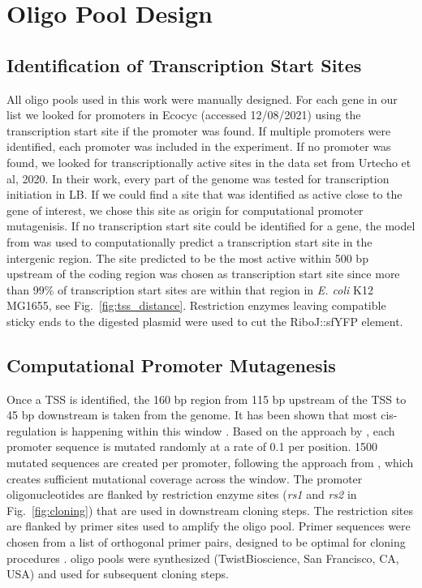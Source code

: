 \section{Oligo Pool Design} \label{sec:oligo_pool}
\subsection{Identification of Transcription Start Sites}
\label{sec:ident_tss}
All oligo pools used in this work were manually designed. For each gene in our list we looked for promoters in Ecocyc \cite{keseler2010ecocyc} (accessed 12/08/2021) using the transcription start site if the promoter was found. If multiple promoters were identified, each promoter was included in the experiment. If no promoter was found, we looked for transcriptionally active sites in the data set from Urtecho et al, 2020\cite{urtecho2020genome}. In their work, every part of the genome was tested for transcription initiation in LB. If we could find a site that was identified as active close to the gene of interest, we chose this site as origin for computational promoter mutagenisis. If no transcription start site could be identified for a gene, the model from \cite{la2021automated} was used to computationally predict a transcription start site in the intergenic region. The site predicted to be the most active within 500 bp upstream of the coding region was chosen as transcription start site since more than 99\% of transcription start sites are within that region in \textit{E. coli} K12 MG1655, see Fig.~\ref{fig:tss_distance}. Restriction enzymes leaving compatible sticky ends to the digested plasmid were used to cut the RiboJ::sfYFP element.  


\subsection{Computational Promoter Mutagenesis}
\label{sec:comp_prom_muta}
Once a TSS is identified, the 160 bp region from 115 bp upstream of the TSS to 45 bp downstream is taken from the genome. It has been shown that most cis-regulation is happening within this window \cite{rydenfelt2014statistical}. Based on the approach by \cite{kinney2010using}, each promoter sequence is mutated randomly at a rate of 0.1 per position. 1500 mutated sequences are created per promoter, following the approach from \cite{ireland2020deciphering}, which creates sufficient mutational coverage across the window. The promoter oligonucleotides are flanked by restriction enzyme sites (\textit{rs1} and \textit{rs2} in Fig.~\ref{fig:cloning}) that are used in downstream cloning steps. The restriction sites are flanked by primer sites used to amplify the oligo pool. Primer sequences were chosen from a list of orthogonal primer pairs, designed to be optimal for cloning procedures \cite{subramanian2018set}. oligo pools were synthesized (TwistBioscience, San Francisco, CA, USA) and used for subsequent cloning steps.


